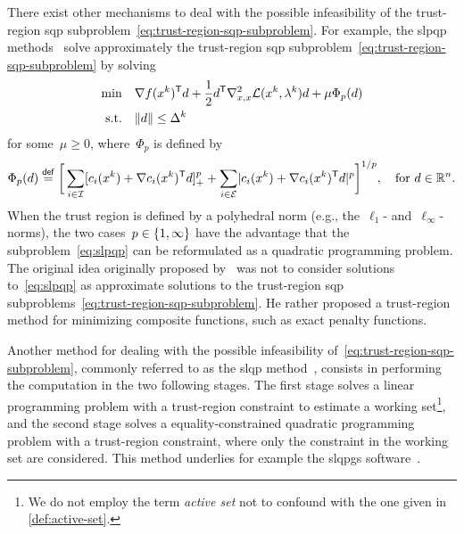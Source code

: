 There exist other mechanisms to deal with the possible infeasibility of the trust-region \gls{sqp} subproblem~\cref{eq:trust-region-sqp-subproblem}.
For example, the \gls{slpqp} methods~\cite{Fletcher_1982a,Yuan_1995,Gould_2021} solve approximately the trust-region \gls{sqp} subproblem~\cref{eq:trust-region-sqp-subproblem} by solving
\begin{subequations}
    \label{eq:slpqp}
    \begin{align}
        \min        & \quad \nabla \obj(\iter[k])^{\T} \step + \frac{1}{2} \step^{\T} \nabla_{x, x}^2 \lag(\iter[k], \lm[k]) \step + \mu \Phi_p(d)\\
        \text{s.t.} & \quad \norm{d} \le \rad[k]
    \end{align}
\end{subequations}
for some~$\mu \ge 0$, where~$\Phi_p$ is defined by
\begin{equation*}
    \Phi_p(d) \eqdef \bigg[ \sum_{i \in \iub} \posp{\con{i}(\iter[k]) + \nabla \con{i}(\iter[k])^{\T} \step}^p + \sum_{i \in \ieq} \abs{\con{i}(\iter[k]) + \nabla \con{i}(\iter[k])^{\T} \step}^p \bigg]^{1/p}, \quad \text{for~$d \in \R^n$.}
\end{equation*}
When the trust region is defined by a polyhedral norm (e.g., the~$\ell_1$- and~$\ell_{\infty}$-norms), the two cases~$p \in \{1, \infty\}$ have the advantage that the subproblem~\cref{eq:slpqp} can be reformulated as a quadratic programming problem.
The original idea originally proposed by~\cite{Fletcher_1982a} was not to consider solutions to~\cref{eq:slpqp} as approximate solutions to the trust-region \gls{sqp} subproblems~\cref{eq:trust-region-sqp-subproblem}.
He rather proposed a trust-region method for minimizing composite functions, such as exact penalty functions.

Another method for dealing with the possible infeasibility of~\cref{eq:trust-region-sqp-subproblem}, commonly referred to as the \gls{slqp} method~\cite{Fletcher_Maza_1989,Byrd_Etal_2004}, consists in performing the computation in the two following stages.
The first stage solves a linear programming problem with a trust-region constraint to estimate a working set\footnote{We do not employ the term \emph{active set} not to confound with the one given in \cref{def:active-set}.}, and the second stage solves a equality-constrained quadratic programming problem with a trust-region constraint, where only the constraint in the working set are considered.
This method underlies for example the \gls{slqpgs} software~\cite{Curtis_Overton_2012}.


